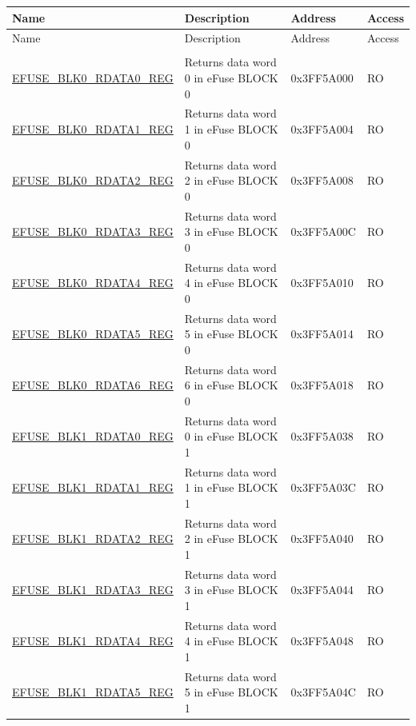 \begin{longtable}{ | p{5cm} | p{7.5cm} | p{2cm} | p{1cm} | }
\hline
\rowcolor{lightgray}
Name & Description &  Address & Access \\ \hline
        \endfirsthead
        \hline
        \rowcolor{lightgray}
Name & Description &  Address & Access \\
        \hline
        \endhead
        \endfoot
\multicolumn{4}{|l|}{\textbf{eFuse data read registers}} \\ \hline
\hyperref[regdesc:EFUSEBLK0RDATA0REG]{EFUSE\_BLK0\_RDATA0\_REG} & Returns data word 0 in eFuse BLOCK 0 & 0x3FF5A000 & RO \\ \hline
\hyperref[regdesc:EFUSEBLK0RDATA1REG]{EFUSE\_BLK0\_RDATA1\_REG} & Returns data word 1 in eFuse BLOCK 0 & 0x3FF5A004 & RO \\ \hline
\hyperref[regdesc:EFUSEBLK0RDATA2REG]{EFUSE\_BLK0\_RDATA2\_REG} & Returns data word 2 in eFuse BLOCK 0 & 0x3FF5A008 & RO \\ \hline
\hyperref[regdesc:EFUSEBLK0RDATA3REG]{EFUSE\_BLK0\_RDATA3\_REG} & Returns data word 3 in eFuse BLOCK 0 & 0x3FF5A00C & RO \\ \hline
\hyperref[regdesc:EFUSEBLK0RDATA4REG]{EFUSE\_BLK0\_RDATA4\_REG} & Returns data word 4 in eFuse BLOCK 0 & 0x3FF5A010 & RO \\ \hline
\hyperref[regdesc:EFUSEBLK0RDATA5REG]{EFUSE\_BLK0\_RDATA5\_REG} & Returns data word 5 in eFuse BLOCK 0 & 0x3FF5A014 & RO \\ \hline
\hyperref[regdesc:EFUSEBLK0RDATA6REG]{EFUSE\_BLK0\_RDATA6\_REG} & Returns data word 6 in eFuse BLOCK 0 & 0x3FF5A018 & RO \\ \hline
\hyperref[regdesc:EFUSEBLK1RDATAnREG]{EFUSE\_BLK1\_RDATA0\_REG} & Returns data word 0 in eFuse BLOCK 1 & 0x3FF5A038 & RO \\ \hline
\hyperref[regdesc:EFUSEBLK1RDATAnREG]{EFUSE\_BLK1\_RDATA1\_REG} & Returns data word 1 in eFuse BLOCK 1 & 0x3FF5A03C & RO \\ \hline
\hyperref[regdesc:EFUSEBLK1RDATAnREG]{EFUSE\_BLK1\_RDATA2\_REG} & Returns data word 2 in eFuse BLOCK 1 & 0x3FF5A040 & RO \\ \hline
\hyperref[regdesc:EFUSEBLK1RDATAnREG]{EFUSE\_BLK1\_RDATA3\_REG} & Returns data word 3 in eFuse BLOCK 1 & 0x3FF5A044 & RO \\ \hline
\hyperref[regdesc:EFUSEBLK1RDATAnREG]{EFUSE\_BLK1\_RDATA4\_REG} & Returns data word 4 in eFuse BLOCK 1 & 0x3FF5A048 & RO \\ \hline
\hyperref[regdesc:EFUSEBLK1RDATAnREG]{EFUSE\_BLK1\_RDATA5\_REG} & Returns data word 5 in eFuse BLOCK 1 & 0x3FF5A04C & RO \\ \hline

\end{longtable}
